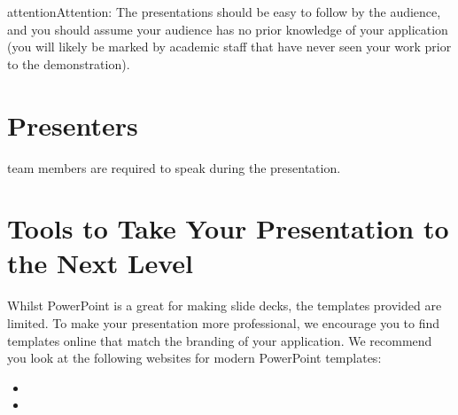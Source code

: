\documentclass[letterpaper,10pt,english]{jupyterBook}
\begin{document}
\begin{sphinxadmonition}{attention}{Attention:}
\sphinxAtStartPar
The presentations should be easy to follow by the audience, and
you should assume your audience has no prior knowledge of your
application (you will likely be marked by academic staff that have never
seen your work prior to the demonstration).
\end{sphinxadmonition}


\section{Presenters}
\label{\detokenize{chapter_14/final_presentation:presenters}}
\sphinxAtStartPar
{} team members are required to speak during the presentation.


\section{Tools to Take Your Presentation to the Next Level}
\label{\detokenize{chapter_14/final_presentation:tools-to-take-your-presentation-to-the-next-level}}
\sphinxAtStartPar
Whilst PowerPoint is a great for making slide decks, the templates
provided are limited. To make your presentation more professional, we
encourage you to find templates online that match the branding of your
application. We recommend you look at the following websites for modern
PowerPoint templates:
\begin{itemize}
\item {} 
\sphinxAtStartPar
{}

\item {} 
\sphinxAtStartPar
{}

\end{itemize}
\end{document}
